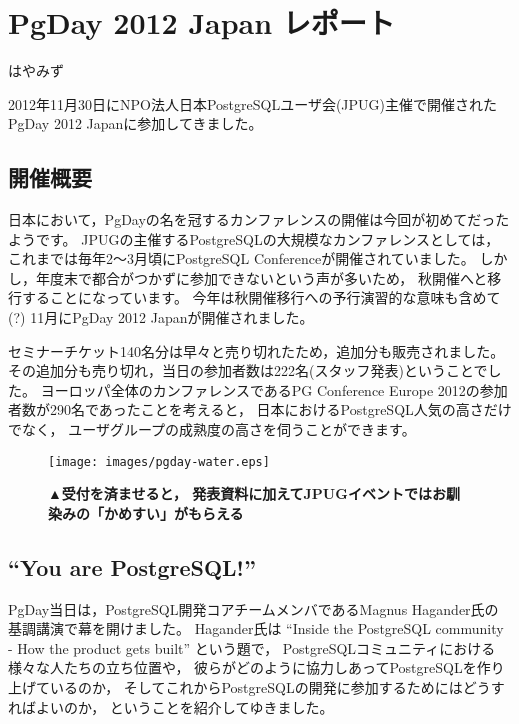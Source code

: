 
\chapter{PgDay 2012 Japan レポート}

\begin{flushright}
 {\headfont はやみず}
\end{flushright}

2012年11月30日にNPO法人日本PostgreSQLユーザ会(JPUG)主催で開催されたPgDay 2012 Japanに参加してきました。

\section{開催概要}

日本において，PgDayの名を冠するカンファレンスの開催は今回が初めてだったようです。
JPUGの主催するPostgreSQLの大規模なカンファレンスとしては，
これまでは毎年2〜3月頃にPostgreSQL Conferenceが開催されていました。
しかし，年度末で都合がつかずに参加できないという声が多いため，
秋開催へと移行することになっています。
今年は秋開催移行への予行演習的な意味も含めて(?)
11月にPgDay 2012 Japanが開催されました。

セミナーチケット140名分は早々と売り切れたため，追加分も販売されました。
その追加分も売り切れ，当日の参加者数は222名(スタッフ発表)ということでした。
ヨーロッパ全体のカンファレンスであるPG Conference Europe 2012の参加者数が290名であったことを考えると，
日本におけるPostgreSQL人気の高さだけでなく，
ユーザグループの成熟度の高さを伺うことができます。

\begin{figure}[tb]
 \begin{center}
  \texttt{[image: images/pgday-water.eps]}\par
  \noindent 
{\bf ▲受付を済ませると，
  発表資料に加えてJPUGイベントではお馴染みの「かめすい」がもらえる}
 \end{center}
\end{figure}

\section{``You are PostgreSQL!''}

PgDay当日は，PostgreSQL開発コアチームメンバであるMagnus Hagander氏の基調講演で幕を開けました。
Hagander氏は ``Inside the PostgreSQL community - How the product gets built'' という題で，
PostgreSQLコミュニティにおける様々な人たちの立ち位置や，
彼らがどのように協力しあってPostgreSQLを作り上げているのか，
そしてこれからPostgreSQLの開発に参加するためにはどうすればよいのか，
ということを紹介してゆきました。

